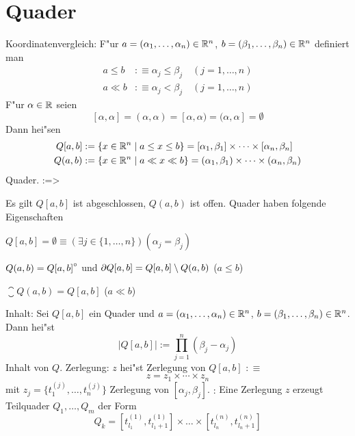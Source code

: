 \section{Quader}
 Koordinatenvergleich:{
  F"ur $a=(\alpha_1,\ldots,\alpha_n)\in\mathbb R^n$, 
  $b=(\beta_1,\ldots,\beta_n)\in\mathbb R^n$
  definiert man
  \begin{align*}
    a \leq b &:\equiv \alpha_j\leq \beta_j \quad (j=1,\ldots,n) \\
    a \ll b &:\equiv \alpha_j<\beta_j \quad (j=1,\ldots,n)
    \end{align*}
  F"ur $\alpha\in\mathbb R$ seien
  \[[\alpha,\alpha]=(\alpha,\alpha)=[\alpha,\alpha)=(\alpha,\alpha]=\emptyset
    \]
  Dann hei"sen
  \begin{align*}
    Q[a,b]&:=\{x\in\mathbb R^n\mid a\leq x\leq b\}
       = [\alpha_1,\beta_1]\times\cdots\times[\alpha_n,\beta_n] \\
    Q(a,b)&:=\{x\in\mathbb R^n\mid a\ll x\ll b\}
       = (\alpha_1,\beta_1)\times\cdots\times(\alpha_n,\beta_n)
    \end{align*}
  Quader.
  }
\lessertheorem:=>{
  Es gilt $Q[a,b]$ ist abgeschlossen, $Q(a,b)$ ist offen. Quader haben 
  folgende Eigenschaften
  \begin{stmts}
    \item $Q[a,b]=\emptyset \equiv (\exists j\in\{1,\ldots,n\})(\alpha_j=\beta_j)$ 
    \item $Q(a,b)={Q[a,b]}^\circ$ und $\partial{Q[a,b]}=Q[a,b]\setminus Q(a,b)$ ($a\leq b$)
    \item $\closure{Q(a,b)}=Q[a,b]$ ($a\ll b$)
    \end{stmts}
  }
 Inhalt:{
  Sei $Q[a,b]$ ein Quader und $a=(\alpha_1,\ldots,\alpha_n)\in\mathbb R^n$, 
  $b=(\beta_1,\ldots,\beta_n)\in\mathbb R^n$. Dann hei"st
  \[|Q[a,b]|:=\prod_{j=1}^n (\beta_j-\alpha_j)
    \]
  Inhalt von $Q$.
  }
 Zerlegung:{
 $z$ hei"st Zerlegung von $Q[a,b]$ $:\equiv$
 \[z=z_1\times\cdots\times z_n
   \]
 mit $z_j=\{t_1^{(j)},\ldots,t_n^{(j)}\}$ Zerlegung von $[\alpha_j,\beta_j]$.
}
\remark:{
  Eine Zerlegung $z$ erzeugt Teilquader $Q_1,\ldots,Q_m$ der Form
  \[Q_k=[t_{l_1}^{(1)},t_{l_1+1}^{(1)}]\times \ldots \times
        [t_{l_n}^{(n)},t_{l_n+1}^{(n)}]
    \]
  }
